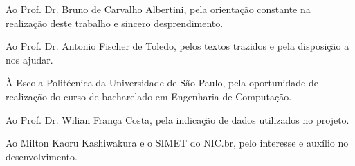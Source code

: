 \documentclass[]{politex}
\begin{document}
\capa
\falsafolhaderosto
\folhaderosto








\begin{agradecimentos}

Ao Prof. Dr. Bruno de Carvalho Albertini, pela orientação constante na realização
deste trabalho e sincero desprendimento.

Ao Prof. Dr. Antonio Fischer de Toledo, pelos textos trazidos e pela disposição a
nos ajudar.

À Escola Politécnica da Universidade de São Paulo, pela oportunidade de
realização do curso de bacharelado em Engenharia de Computação.

Ao Prof. Dr. Wilian França Costa, pela indicação de dados utilizados no projeto.

Ao Milton Kaoru Kashiwakura e o SIMET do NIC.br, pelo interesse e auxílio no
desenvolvimento.

\end{agradecimentos}


\end{document}
